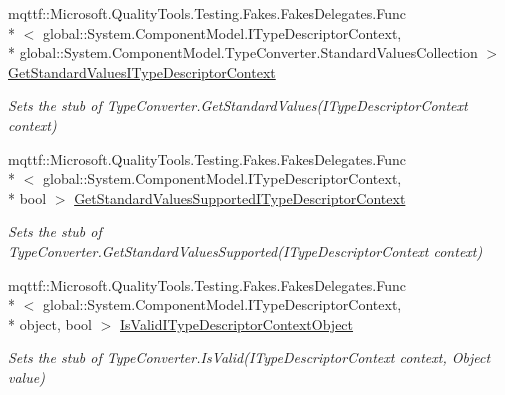 \begin{DoxyCompactItemize}
mqttf\-::\-Microsoft.\-Quality\-Tools.\-Testing.\-Fakes.\-Fakes\-Delegates.\-Func\\*
$<$ global\-::\-System.\-Component\-Model.\-I\-Type\-Descriptor\-Context, \\*
global\-::\-System.\-Component\-Model.\-Type\-Converter.\-Standard\-Values\-Collection $>$ \hyperlink{class_system_1_1_component_model_1_1_fakes_1_1_stub_multiline_string_converter_ace92269c67cb2bc6ae3317373222941e}{Get\-Standard\-Values\-I\-Type\-Descriptor\-Context}
\begin{DoxyCompactList}\small\item\em Sets the stub of Type\-Converter.\-Get\-Standard\-Values(\-I\-Type\-Descriptor\-Context context)\end{DoxyCompactList}\item 
mqttf\-::\-Microsoft.\-Quality\-Tools.\-Testing.\-Fakes.\-Fakes\-Delegates.\-Func\\*
$<$ global\-::\-System.\-Component\-Model.\-I\-Type\-Descriptor\-Context, \\*
bool $>$ \hyperlink{class_system_1_1_component_model_1_1_fakes_1_1_stub_multiline_string_converter_a94179ba8d30d5b28d11b6b23d85bbbf6}{Get\-Standard\-Values\-Supported\-I\-Type\-Descriptor\-Context}
\begin{DoxyCompactList}\small\item\em Sets the stub of Type\-Converter.\-Get\-Standard\-Values\-Supported(\-I\-Type\-Descriptor\-Context context)\end{DoxyCompactList}\item 
mqttf\-::\-Microsoft.\-Quality\-Tools.\-Testing.\-Fakes.\-Fakes\-Delegates.\-Func\\*
$<$ global\-::\-System.\-Component\-Model.\-I\-Type\-Descriptor\-Context, \\*
object, bool $>$ \hyperlink{class_system_1_1_component_model_1_1_fakes_1_1_stub_multiline_string_converter_a3e3ac44dfd1208a2c550a0f4699b8bf8}{Is\-Valid\-I\-Type\-Descriptor\-Context\-Object}
\begin{DoxyCompactList}\small\item\em Sets the stub of Type\-Converter.\-Is\-Valid(\-I\-Type\-Descriptor\-Context context, Object value)\end{DoxyCompactList}\end{DoxyCompactItemize}
